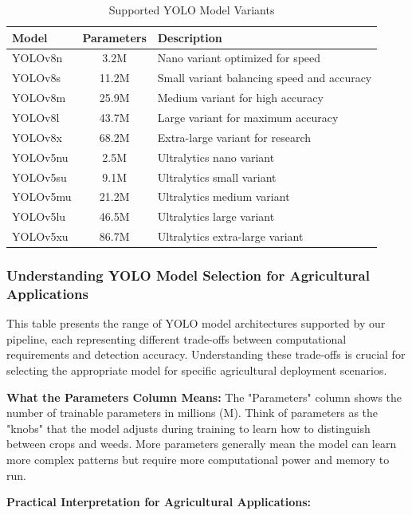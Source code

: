 \begin{table}[H]
\centering
\caption{Supported YOLO Model Variants}
\label{tab:yolo_models}
\begin{tabular}{@{}lcp{6cm}@{}}
\toprule
\textbf{Model} & \textbf{Parameters} & \textbf{Description} \\
\midrule
YOLOv8n & 3.2M & Nano variant optimized for speed \\
YOLOv8s & 11.2M & Small variant balancing speed and accuracy \\
YOLOv8m & 25.9M & Medium variant for high accuracy \\
YOLOv8l & 43.7M & Large variant for maximum accuracy \\
YOLOv8x & 68.2M & Extra-large variant for research \\
YOLOv5nu & 2.5M & Ultralytics nano variant \\
YOLOv5su & 9.1M & Ultralytics small variant \\
YOLOv5mu & 21.2M & Ultralytics medium variant \\
YOLOv5lu & 46.5M & Ultralytics large variant \\
YOLOv5xu & 86.7M & Ultralytics extra-large variant \\
\bottomrule
\end{tabular}
\end{table}

\subsubsection{Understanding YOLO Model Selection for Agricultural Applications}

This table presents the range of YOLO model architectures supported by our pipeline, each representing different trade-offs between computational requirements and detection accuracy. Understanding these trade-offs is crucial for selecting the appropriate model for specific agricultural deployment scenarios.

\textbf{What the Parameters Column Means:} The "Parameters" column shows the number of trainable parameters in millions (M). Think of parameters as the "knobs" that the model adjusts during training to learn how to distinguish between crops and weeds. More parameters generally mean the model can learn more complex patterns but require more computational power and memory to run.

\textbf{Practical Interpretation for Agricultural Applications:}

